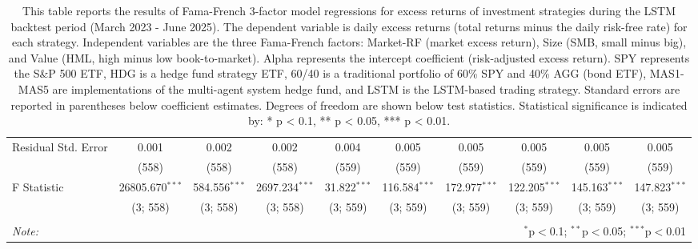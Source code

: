 \begin{table}[!htbp]
\begin{tabular}{@{\extracolsep{5pt}}lccccccccc}
 Residual Std. Error & 0.001 & 0.002 & 0.002 & 0.004 & 0.005 & 0.005 & 0.005 & 0.005 & 0.005 \\
 & (558) & (558) & (558) & (559) & (559) & (559) & (559) & (559) & (559) \\
 F Statistic & 26805.670$^{***}$ & 584.556$^{***}$ & 2697.234$^{***}$ & 31.822$^{***}$ & 116.584$^{***}$ & 172.977$^{***}$ & 122.205$^{***}$ & 145.163$^{***}$ & 147.823$^{***}$ \\
 & (3; 558) & (3; 558) & (3; 558) & (3; 559) & (3; 559) & (3; 559) & (3; 559) & (3; 559) & (3; 559) \\
\hline
\hline \\[-1.8ex]
\textit{Note:} & \multicolumn{9}{r}{$^{*}$p$<$0.1; $^{**}$p$<$0.05; $^{***}$p$<$0.01} \\
\end{tabular}
\caption[Fama-French 3-Factor Model Results (LSTM Period)]{This table reports the results of Fama-French 3-factor model regressions for excess returns of investment strategies during the LSTM backtest period (March 2023 - June 2025). The dependent variable is daily excess returns (total returns minus the daily risk-free rate) for each strategy. Independent variables are the three Fama-French factors: Market-RF (market excess return), Size (SMB, small minus big), and Value (HML, high minus low book-to-market). Alpha represents the intercept coefficient (risk-adjusted excess return). SPY represents the S\&P 500 ETF, HDG is a hedge fund strategy ETF, 60/40 is a traditional portfolio of 60\% SPY and 40\% AGG (bond ETF), MAS1-MAS5 are implementations of the multi-agent system hedge fund, and LSTM is the LSTM-based trading strategy. Standard errors are reported in parentheses below coefficient estimates. Degrees of freedom are shown below test statistics. Statistical significance is indicated by: * p < 0.1, ** p < 0.05, *** p < 0.01.}
\label{tab:fama_french_3factor_lstm_aligned}
\end{table}